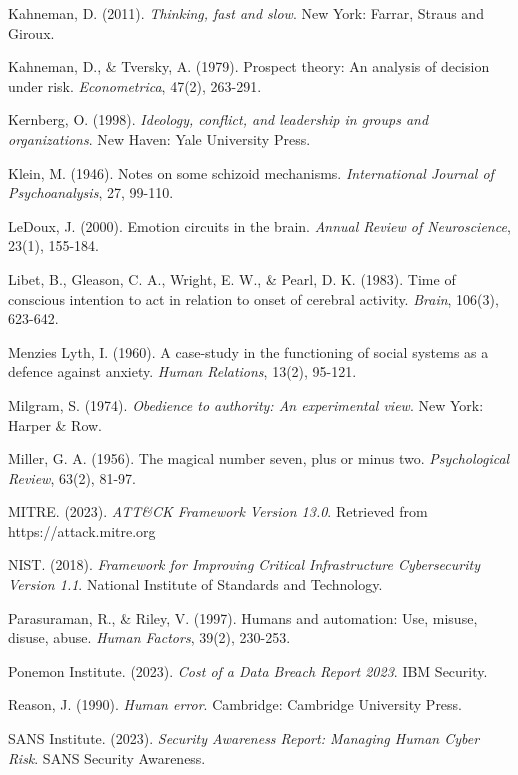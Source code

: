 \documentclass[11pt,a4paper]{article}
\begin{document}
\begin{thebibliography}{99}
Kahneman, D. (2011). \textit{Thinking, fast and slow}. New York: Farrar, Straus and Giroux.

Kahneman, D., \& Tversky, A. (1979). Prospect theory: An analysis of decision under risk. \textit{Econometrica}, 47(2), 263-291.

Kernberg, O. (1998). \textit{Ideology, conflict, and leadership in groups and organizations}. New Haven: Yale University Press.

Klein, M. (1946). Notes on some schizoid mechanisms. \textit{International Journal of Psychoanalysis}, 27, 99-110.

LeDoux, J. (2000). Emotion circuits in the brain. \textit{Annual Review of Neuroscience}, 23(1), 155-184.

Libet, B., Gleason, C. A., Wright, E. W., \& Pearl, D. K. (1983). Time of conscious intention to act in relation to onset of cerebral activity. \textit{Brain}, 106(3), 623-642.

Menzies Lyth, I. (1960). A case-study in the functioning of social systems as a defence against anxiety. \textit{Human Relations}, 13(2), 95-121.

Milgram, S. (1974). \textit{Obedience to authority: An experimental view}. New York: Harper \& Row.

Miller, G. A. (1956). The magical number seven, plus or minus two. \textit{Psychological Review}, 63(2), 81-97.

MITRE. (2023). \textit{ATT\&CK Framework Version 13.0}. Retrieved from https://attack.mitre.org

NIST. (2018). \textit{Framework for Improving Critical Infrastructure Cybersecurity Version 1.1}. National Institute of Standards and Technology.

Parasuraman, R., \& Riley, V. (1997). Humans and automation: Use, misuse, disuse, abuse. \textit{Human Factors}, 39(2), 230-253.

Ponemon Institute. (2023). \textit{Cost of a Data Breach Report 2023}. IBM Security.

Reason, J. (1990). \textit{Human error}. Cambridge: Cambridge University Press.

SANS Institute. (2023). \textit{Security Awareness Report: Managing Human Cyber Risk}. SANS Security Awareness.


\end{thebibliography}
\end{document}
